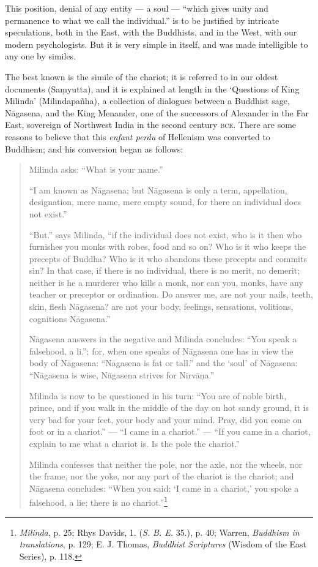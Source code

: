 \documentclass[a4paper, 11pt, oneside, english, landscape]{article}
\begin{document}
This position, denial of any entity --- a soul --- ``which gives unity and permanence to what we call the individual.'' is to be justified by intricate speculations, both in the East, with the Buddhists, and in the West, with our modern psychologists. But it is very simple in itself, and was made intelligible to any one by similes.

The best known is the simile of the chariot; it is referred to in our oldest documents (Saṃyutta), and it is explained at length in the `Questions of King Milinda' (Milindapañha), a collection of dialogues between a Buddhist sage, Nāgasena, and the King Menander, one of the successors of Alexander in the Far East, sovereign of Northwest India in the second century \textsc{bce}. There are some reasons to believe that this \emph{enfant perdu} of Hellenism was converted to Buddhism; and his conversion began as follows: 
\begin{quotation}
\small
Milinda asks: ``What is your name.''

``I am known as Nāgasena; but Nāgasena is only a term, appellation, designation, mere name, mere empty sound, for there an individual does not exist.''

``But.'' says Milinda, ``if the individual does not exist, who is it then who furnishes you monks with robes, food and so on? Who is it who keeps the precepts of Buddha? Who is it who abandons these precepts and commits sin? In that case, if there is no individual, there is no merit, no demerit; neither is he a murderer who kills a monk, nor can you, monks, have any teacher or preceptor or ordination. Do answer me, are not your nails, teeth, skin, flesh Nāgasena? are not your body, feelings, sensations, volitions, cognitions Nāgasena.''

Nāgasena answers in the negative and Milinda concludes: ``You speak a falsehood, a li.''; for, when one speaks of Nāgasena one has in view the body of Nāgasena: ``Nāgasena is fat or tall.'' and the `soul' of Nāgasena: ``Nāgasena is wise, Nāgasena strives for Nirvāṇa.''

Milinda is now to be questioned in his turn: ``You are of noble birth, prince, and if you walk in the middle of the day on hot sandy ground, it is very bad for your feet, your body and your mind. Pray, did you come on foot or in a chariot.'' --- ``I came in a chariot.'' --- ``If you came in a chariot, explain to me what a chariot is. Is the pole the chariot.''

Milinda confesses that neither the pole, nor the axle, nor the wheels, nor the frame, nor the yoke, nor any part of the chariot is the chariot; and Nāgasena concludes: ``When you said: `I came in a chariot,' you spoke a falsehood, a lie; there is no chariot.''\footnote{\emph{Milinda}, p. 25; Rhys Davids, 1. (\emph{S. B. E.} 35.), p. 40; Warren, \emph{Buddhism in translations}, p. 129; E. J. Thomas, \emph{Buddhist Scriptures} (Wisdom of the East Series), p. 118.}
\end{quotation}
\end{document}
